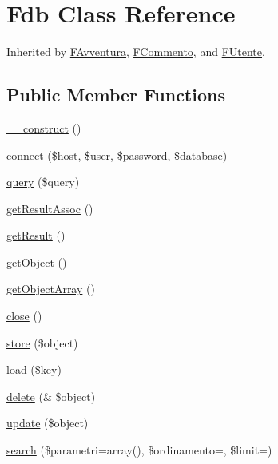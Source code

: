 \hypertarget{class_fdb}{}\section{Fdb Class Reference}
\label{class_fdb}


Inherited by \mbox{\hyperlink{class_f_avventura}{F\+Avventura}}, \mbox{\hyperlink{class_f_commento}{F\+Commento}}, and \mbox{\hyperlink{class_f_utente}{F\+Utente}}.

\subsection*{Public Member Functions}
\begin{DoxyCompactItemize}
\item 
\mbox{\hyperlink{class_fdb_a095c5d389db211932136b53f25f39685}{\+\_\+\+\_\+construct}} ()
\item 
\mbox{\hyperlink{class_fdb_afbc5dcb1ce78ec5dabf3d70cffbd9da7}{connect}} (\$host, \$user, \$password, \$database)
\item 
\mbox{\hyperlink{class_fdb_afbf3cf8f76801c717232f8a723bac177}{query}} (\$query)
\item 
\mbox{\hyperlink{class_fdb_a3c1f4f1ffa871d0097a114a99771de35}{get\+Result\+Assoc}} ()
\item 
\mbox{\hyperlink{class_fdb_ae077eb8a032a325ceb939bfabfa5f472}{get\+Result}} ()
\item 
\mbox{\hyperlink{class_fdb_a8ecaa7401cc1e1144cb98698a9658ebc}{get\+Object}} ()
\item 
\mbox{\hyperlink{class_fdb_a8c905ea0a0d60236497a91479c04c21a}{get\+Object\+Array}} ()
\item 
\mbox{\hyperlink{class_fdb_aa69c8bf1f1dcf4e72552efff1fe3e87e}{close}} ()
\item 
\mbox{\hyperlink{class_fdb_a6221a0139063da1d2b1fa70d1d1fbe9c}{store}} (\$object)
\item 
\mbox{\hyperlink{class_fdb_a8d0a51036af71436a1e8dcc26fc4281d}{load}} (\$key)
\item 
\mbox{\hyperlink{class_fdb_a7cd3a048e7e410beed8ccc3f1bf597f5}{delete}} (\& \$object)
\item 
\mbox{\hyperlink{class_fdb_ab745d0b824e697c1e13747e68eed9fff}{update}} (\$object)
\item 
\mbox{\hyperlink{class_fdb_a2fd225ebf3ec2f40d21ff95249b031b9}{search}} (\$parametri=array(), \$ordinamento=\textquotesingle{}\textquotesingle{}, \$limit=\textquotesingle{}\textquotesingle{})
\end{DoxyCompactItemize}
